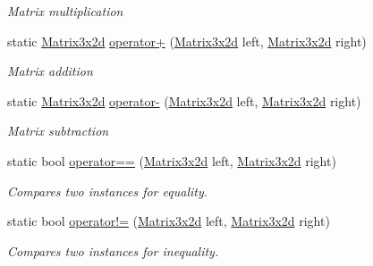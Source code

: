 \begin{DoxyCompactItemize}
\begin{DoxyCompactList}\small\item\em Matrix multiplication \end{DoxyCompactList}\item 
static \hyperlink{struct_open_t_k_1_1_matrix3x2d}{Matrix3x2d} \hyperlink{struct_open_t_k_1_1_matrix3x2d_a7aeac666f30460adfcdb5b96f3353ee3}{operator+} (\hyperlink{struct_open_t_k_1_1_matrix3x2d}{Matrix3x2d} left, \hyperlink{struct_open_t_k_1_1_matrix3x2d}{Matrix3x2d} right)
\begin{DoxyCompactList}\small\item\em Matrix addition \end{DoxyCompactList}\item 
static \hyperlink{struct_open_t_k_1_1_matrix3x2d}{Matrix3x2d} \hyperlink{struct_open_t_k_1_1_matrix3x2d_a4f8ec1893c47e78424c63acf640f1067}{operator-\/} (\hyperlink{struct_open_t_k_1_1_matrix3x2d}{Matrix3x2d} left, \hyperlink{struct_open_t_k_1_1_matrix3x2d}{Matrix3x2d} right)
\begin{DoxyCompactList}\small\item\em Matrix subtraction \end{DoxyCompactList}\item 
static bool \hyperlink{struct_open_t_k_1_1_matrix3x2d_a2726ecf4ae52adf1bff45375ab0c43bb}{operator==} (\hyperlink{struct_open_t_k_1_1_matrix3x2d}{Matrix3x2d} left, \hyperlink{struct_open_t_k_1_1_matrix3x2d}{Matrix3x2d} right)
\begin{DoxyCompactList}\small\item\em Compares two instances for equality. \end{DoxyCompactList}\item 
static bool \hyperlink{struct_open_t_k_1_1_matrix3x2d_a2e380fa6fa0982736dd528d0cc4a1f2b}{operator!=} (\hyperlink{struct_open_t_k_1_1_matrix3x2d}{Matrix3x2d} left, \hyperlink{struct_open_t_k_1_1_matrix3x2d}{Matrix3x2d} right)
\begin{DoxyCompactList}\small\item\em Compares two instances for inequality. \end{DoxyCompactList}\end{DoxyCompactItemize}
